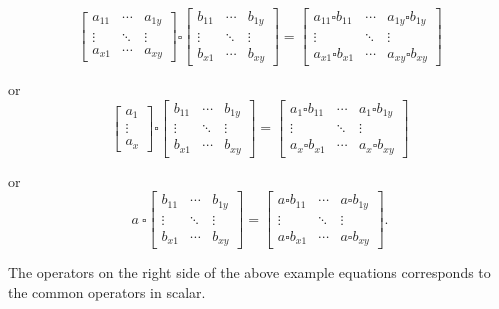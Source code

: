 \documentclass[
  oneside, a4paper, 12pt, openany]{book}
\theoremstyle{definition}
\theoremstyle{definition}
\theoremstyle{definition}
\theoremstyle{definition}
\theoremstyle{remark}
\begin{document}
\[
\begin{bmatrix}a_{11} &\cdots  & a_{1y} \\ \vdots & \ddots & \vdots  \\ a_{x1} & \cdots & a_{xy} \end{bmatrix}
\square
\begin{bmatrix}b_{11} &\cdots  & b_{1y} \\ \vdots & \ddots & \vdots  \\ b_{x1} & \cdots & b_{xy} \end{bmatrix}
=
\begin{bmatrix}a_{11} \square b_{11} &\cdots  & a_{1y} \square b_{1y} \\ \vdots & \ddots & \vdots  \\ a_{x1} \square b_{x1}  & \cdots & a_{xy} \square b_{xy} \end{bmatrix}
\]

or
\vspace{0.2cm}
\[
\begin{bmatrix}a_{1} \\ \vdots \\ a_{x} \end{bmatrix}
\square
\begin{bmatrix}b_{11} &\cdots  & b_{1y} \\ \vdots & \ddots & \vdots  \\ b_{x1} & \cdots & b_{xy} \end{bmatrix}
=
\begin{bmatrix}a_{1} \square b_{11} &\cdots  & a_{1} \square b_{1y} \\ \vdots & \ddots & \vdots  \\ a_{x} \square b_{x1}  & \cdots & a_{x} \square b_{xy} \end{bmatrix}
\]

or
\vspace{0.2cm}
\[
a \ 
\square
\begin{bmatrix}b_{11} &\cdots  & b_{1y} \\ \vdots & \ddots & \vdots  \\ b_{x1} & \cdots & b_{xy} \end{bmatrix}
=
\begin{bmatrix}a \square b_{11} &\cdots  & a \square b_{1y} \\ \vdots & \ddots & \vdots  \\ a \square b_{x1}  & \cdots & a \square b_{xy} \end{bmatrix}.
\]

The operators on the right side of the above example equations corresponds to the common operators in scalar.
\end{document}
